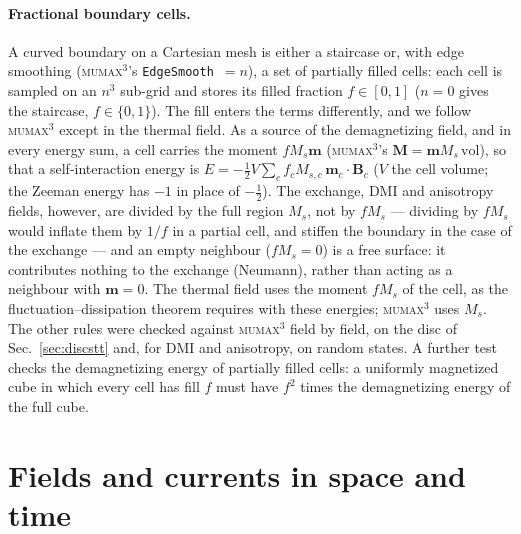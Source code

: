 \documentclass{article}      %
\newcommand{\mumax}{\textsc{mumax}$^3$}
\newcommand{\vm}{\bm{m}}
\newcommand{\vB}{\bm{B}}
\begin{document}
\paragraph{Fractional boundary cells.}
A curved boundary on a Cartesian mesh is either a staircase or, with edge
smoothing (\mumax's \texttt{EdgeSmooth}~$=n$), a set of partially filled cells:
each cell is sampled on an $n^3$ sub-grid and stores its filled fraction
$f\in[0,1]$ ($n=0$ gives the staircase, $f\in\{0,1\}$). The fill enters the
terms differently, and we follow \mumax{} except in the thermal field. As a source of the
demagnetizing field, and in every energy sum, a cell carries the moment
$fM_s\vm$ (\mumax's $\bm{M}=\vm M_s\,\mathrm{vol}$), so that a self-interaction
energy is $E = -\tfrac12 V\sum_c f_cM_{s,c}\,\vm_c\cdot\vB_c$ ($V$ the cell
volume; the Zeeman energy has $-1$ in place of $-\tfrac12$). The exchange, DMI and
anisotropy fields, however, are divided by the full region $M_s$, not by $fM_s$ ---
dividing by $fM_s$ would inflate them by $1/f$ in a partial cell, and stiffen the
boundary in the case of the exchange --- and an empty neighbour ($fM_s=0$) is a free
surface: it contributes nothing to the exchange (Neumann), rather than acting as a
neighbour with $\vm=0$. The thermal field uses the moment $fM_s$ of the cell, as the
fluctuation--dissipation theorem requires with these energies; \mumax{} uses $M_s$. The
other rules were checked against \mumax{} field by field, on the disc of
Sec.~\ref{sec:discstt} and, for DMI and anisotropy, on random states. A further test
checks the demagnetizing energy of partially filled cells: a uniformly magnetized cube in which
every cell has fill $f$ must have $f^2$ times the demagnetizing energy of the full cube.

\section{Fields and currents in space and time}
\label{sec:excitation}
\end{document}
